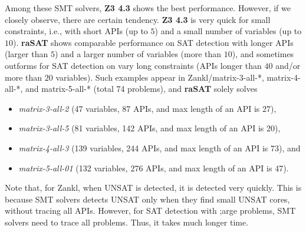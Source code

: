 Among these SMT solvers, {\bf Z3 4.3} shows the best performance. 
However, if we closely observe, there are certain tendency. 
{\bf Z3 4.3} is very quick for small constraints, i.e., with 
short APIs (up to $5$) and a small number of variables (up to $10$). 
{\bf raSAT} shows comparable performance on SAT detection with 
longer APIs (larger than $5$) and a larger number of variables (more than $10$), 
and sometimes outforms for SAT detection on vary long constraints 
(APIs longer than $40$ and/or more than $20$ variables). 
Such examples appear in Zankl/matrix-3-all-*, matrix-4-all-*, and matrix-5-all-* 
(total 74 problems), and {\bf raSAT} solely solves 
\begin{itemize}
\item {\em matrix-3-all-2} (47 variables, 87 APIs, and max length of an API is 27), 
\item {\em matrix-3-all-5} (81 variables, 142 APIs, and max length of an API is 20), 
\item {\em matrix-4-all-3} (139 variables, 244 APIs, and max length of an API is 73), and 
\item {\em matrix-5-all-01} (132 variables, 276 APIs, and max length of an API is 47). 
\end{itemize}
Note that, for Zankl, when UNSAT is detected, it is detected very quickly. 
This is because SMT solvers detects UNSAT only when they find small UNSAT cores, 
without tracing all APIs. However, for SAT detection with ;arge problems, 
SMT solvers need to trace all problems. Thus, it takes much longer time. 

\begin{table*}[t]
\centering
{}
\medskip 
\caption{Comparison among SMT solvers} \label{tab:comparison}
\end{table*}


